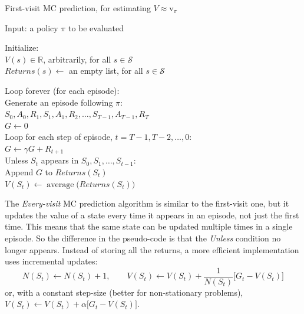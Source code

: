 \begin{algobox}{First-visit MC prediction, for estimating $V \approx \mathrm{v}_\pi$}
\raggedright
Input: a policy $\pi$ to be evaluated

\medskip
Initialize:\\
\hspace*{1.5em}$V(s) \in \mathbb{R}$, arbitrarily, for all $s \in \mathcal{S}$\\
\hspace*{1.5em}$\mathit{Returns}(s) \leftarrow$ an empty list, for all $s \in \mathcal{S}$

\medskip
Loop forever (for each episode):\\
\hspace*{1.5em}Generate an episode following $\pi$:\\
\hspace*{3em}$S_0, A_0, R_1, S_1, A_1, R_2, \dots, S_{T-1}, A_{T-1}, R_T$\\
\hspace*{1.5em}$G \leftarrow 0$\\
\hspace*{1.5em}Loop for each step of episode, $t = T-1, T-2, \dots, 0$:\\
\hspace*{3em}$G \leftarrow \gamma G + R_{t+1}$\\
\hspace*{3em}Unless $S_t$ appears in $S_0, S_1, \dots, S_{t-1}$:\\
\hspace*{4.5em}Append $G$ to $\mathit{Returns}(S_t)$\\
\hspace*{4.5em}$V(S_t) \leftarrow \operatorname{average}\bigl(\mathit{Returns}(S_t)\bigr)$
\end{algobox}

The \textit{Every-visit} MC prediction algorithm is similar to the first-visit one, but it updates the value of a state every time it appears in an episode, not just the first time. This means that the same state can be updated multiple times in a single episode. So the difference in the pseudo-code is that the \textit{Unless} condition no longer appears. Instead of storing all the returns, a more efficient implementation uses incremental updates:
\[N(S_t)\leftarrow N(S_t)+1,\qquad V(S_t)\leftarrow V(S_t)+\frac{1}{N(S_t)}\bigl[G_t-V(S_t)\bigr]\]
or, with a constant step-size (better for non-stationary problems), $V(S_t)\leftarrow V(S_t)+\alpha\bigl[G_t-V(S_t)\bigr]$.

